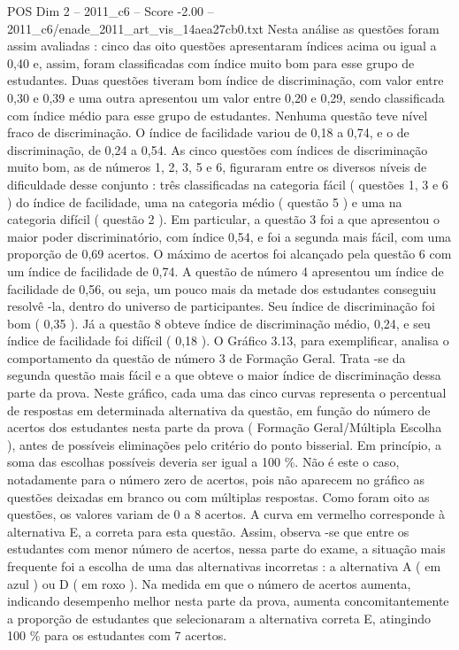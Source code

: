 \begin{textsample}{POS Dim 2 – 2011\_c6 – Score -2.00 – 2011\_c6/enade\_2011\_art\_vis\_14aea27cb0.txt}
Nesta análise as questões foram assim avaliadas : cinco das oito questões apresentaram índices acima ou igual a 0,40 e, assim, foram classificadas com índice muito bom para esse grupo de estudantes.
Duas questões tiveram bom índice de discriminação, com valor entre 0,30 e 0,39 e uma outra apresentou um valor entre 0,20 e 0,29, sendo classificada com índice médio para esse grupo de estudantes.
Nenhuma questão teve nível fraco de discriminação.
O índice de facilidade variou de 0,18 a 0,74, e o de discriminação, de 0,24 a 0,54.
As cinco questões com índices de discriminação muito bom, as de números 1, 2, 3, 5 e 6, figuraram entre os diversos níveis de dificuldade desse conjunto : três classificadas na categoria fácil ( questões 1, 3 e 6 ) do índice de facilidade, uma na categoria médio ( questão 5 ) e uma na categoria difícil ( questão 2 ).
Em particular, a questão 3 foi a que apresentou o maior poder discriminatório, com índice 0,54, e foi a segunda mais fácil, com uma proporção de 0,69 acertos.
O máximo de acertos foi alcançado pela questão 6 com um índice de facilidade de 0,74.
A questão de número 4 apresentou um índice de facilidade de 0,56, ou seja, um pouco mais da metade dos estudantes conseguiu resolvê -la, dentro do universo de participantes.
Seu índice de discriminação foi bom ( 0,35 ).
Já a questão 8 obteve índice de discriminação médio, 0,24, e seu índice de facilidade foi difícil ( 0,18 ).
O Gráfico 3.13, para exemplificar, analisa o comportamento da questão de número 3 de Formação Geral.
Trata -se da segunda questão mais fácil e a que obteve o maior índice de discriminação dessa parte da prova.
Neste gráfico, cada uma das cinco curvas representa o percentual de respostas em determinada alternativa da questão, em função do número de acertos dos estudantes nesta parte da prova ( Formação Geral/Múltipla Escolha ), antes de possíveis eliminações pelo critério do ponto bisserial.
Em princípio, a soma das escolhas possíveis deveria ser igual a 100 \%.
Não é este o caso, notadamente para o número zero de acertos, pois não aparecem no gráfico as questões deixadas em branco ou com múltiplas respostas.
Como foram oito as questões, os valores variam de 0 a 8 acertos.
A curva em vermelho corresponde à alternativa E, a correta para esta questão.
Assim, observa -se que entre os estudantes com menor número de acertos, nessa parte do exame, a situação mais frequente foi a escolha de uma das alternativas incorretas : a alternativa A ( em azul ) ou D ( em roxo ).
Na medida em que o número de acertos aumenta, indicando desempenho melhor nesta parte da prova, aumenta concomitantemente a proporção de estudantes que selecionaram a alternativa correta E, atingindo 100 \% para os estudantes com 7 acertos.

\end{textsample}
